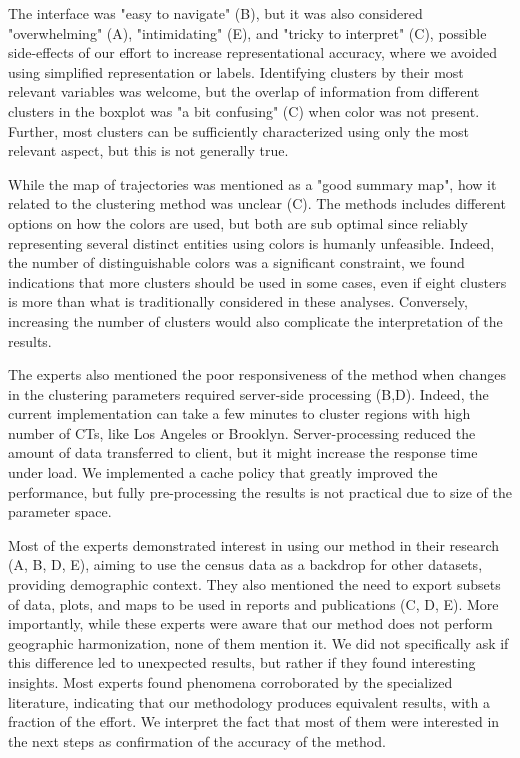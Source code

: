 The interface was "easy to navigate" (B), but it was also considered
"overwhelming" (A), "intimidating" (E), and "tricky to interpret" (C), possible
side-effects of our effort to increase  representational accuracy, where we
avoided using simplified representation or labels. Identifying clusters by their
most relevant variables was welcome, but the overlap of information from
different clusters in the boxplot was "a bit confusing" (C) when color was not
present. Further, most clusters can be sufficiently characterized using only the
most relevant aspect, but this is not generally true. 


While the map of trajectories was mentioned as a "good summary map", how it
related to the clustering method was unclear (C). The methods includes different
options on how the colors are used, but both are sub optimal since reliably
representing several distinct entities using colors is humanly unfeasible.
Indeed, the number of distinguishable colors was a significant constraint, we
found indications that more clusters should be used in some cases, even if eight
clusters is more than what is traditionally considered in these analyses.
Conversely, increasing the number of clusters would also complicate the
interpretation of the results.


The experts also mentioned the poor responsiveness of the method when changes in
the clustering parameters required server-side processing (B,D). Indeed, the
current implementation can take a few minutes to cluster regions with high
number of CTs, like Los Angeles or Brooklyn. Server-processing reduced the
amount of data transferred to client, but it might increase the response time
under load. We implemented a cache policy that greatly improved the performance,
but fully pre-processing the results is not practical due to size of the
parameter space.

Most of the experts demonstrated interest in using our method in their research
(A, B, D, E), aiming to use the census data as a backdrop for other datasets,
providing demographic context. They also mentioned the need to export subsets of
data, plots, and maps to be used in reports and publications (C, D, E). More
importantly, while these experts were aware that our method does not perform
geographic harmonization, none of them mention it. We did not specifically ask
if this difference led to unexpected results, but rather if they found
interesting insights. Most experts found phenomena corroborated by the
specialized literature, indicating that our methodology produces equivalent
results, with a fraction of the effort. We interpret the fact that most of them
were interested in the next steps as confirmation of the accuracy of the method.